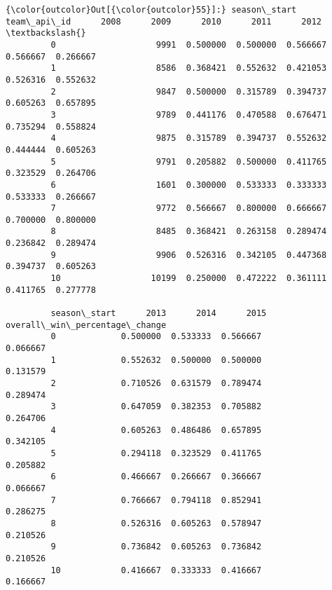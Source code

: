\documentclass[11pt]{article}
\begin{document}
\begin{Verbatim}[commandchars=\\\{\}]
{\color{outcolor}Out[{\color{outcolor}55}]:} season\_start  team\_api\_id      2008      2009      2010      2011      2012  \textbackslash{}
         0                    9991  0.500000  0.500000  0.566667  0.566667  0.266667   
         1                    8586  0.368421  0.552632  0.421053  0.526316  0.552632   
         2                    9847  0.500000  0.315789  0.394737  0.605263  0.657895   
         3                    9789  0.441176  0.470588  0.676471  0.735294  0.558824   
         4                    9875  0.315789  0.394737  0.552632  0.444444  0.605263   
         5                    9791  0.205882  0.500000  0.411765  0.323529  0.264706   
         6                    1601  0.300000  0.533333  0.333333  0.533333  0.266667   
         7                    9772  0.566667  0.800000  0.666667  0.700000  0.800000   
         8                    8485  0.368421  0.263158  0.289474  0.236842  0.289474   
         9                    9906  0.526316  0.342105  0.447368  0.394737  0.605263   
         10                  10199  0.250000  0.472222  0.361111  0.411765  0.277778   
         
         season\_start      2013      2014      2015  overall\_win\_percentage\_change  
         0             0.500000  0.533333  0.566667                       0.066667  
         1             0.552632  0.500000  0.500000                       0.131579  
         2             0.710526  0.631579  0.789474                       0.289474  
         3             0.647059  0.382353  0.705882                       0.264706  
         4             0.605263  0.486486  0.657895                       0.342105  
         5             0.294118  0.323529  0.411765                       0.205882  
         6             0.466667  0.266667  0.366667                       0.066667  
         7             0.766667  0.794118  0.852941                       0.286275  
         8             0.526316  0.605263  0.578947                       0.210526  
         9             0.736842  0.605263  0.736842                       0.210526  
         10            0.416667  0.333333  0.416667                       0.166667  
\end{Verbatim}
            
\end{document}
